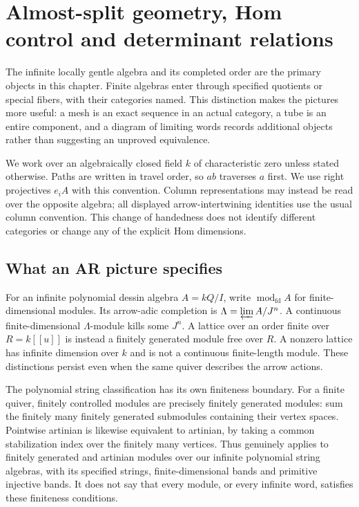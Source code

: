 \chapter[AR geometry and determinant relations]{Almost-split geometry, Hom control and determinant relations}
\label{arb:chapter}

The infinite locally gentle algebra and its completed order are the primary
objects in this chapter. Finite algebras enter through specified quotients or
special fibers, with their categories named. This distinction makes the pictures
more useful: a mesh is an exact sequence in an actual category, a tube is an
entire component, and a diagram of limiting words records additional objects
rather than suggesting an unproved equivalence.

We work over an algebraically closed field $k$ of characteristic zero unless
stated otherwise. Paths are written in travel order, so $ab$ traverses $a$ first.
We use right projectives $e_iA$ with this convention. Column representations may
instead be read over the opposite algebra; all displayed arrow-intertwining
identities use the usual column convention. This change of handedness does not
identify different categories or change any of the explicit Hom dimensions.

\section{What an AR picture specifies}
For an infinite polynomial dessin algebra $A=kQ/I$, write
$\operatorname{mod}_{\mathrm{fd}}A$ for finite-dimensional modules. Its arrow-adic
completion is $\Lambda=\varprojlim A/J^n$. A continuous finite-dimensional
$\Lambda$-module kills some $J^n$. A lattice over an order finite over
$R=k[[u]]$ is instead a finitely generated module free over $R$. A nonzero
lattice has infinite dimension over $k$ and is not a continuous finite-length
module. These distinctions persist even when the same quiver describes the
arrow actions.

The polynomial string classification has its own finiteness boundary.
For a finite quiver, finitely controlled modules are precisely finitely generated
modules: sum the finitely many finitely generated submodules containing their
vertex spaces. Pointwise artinian is likewise equivalent to artinian, by taking
a common stabilization index over the finitely many vertices. Thus
\cite[Theorems 1.2--1.4]{ARBCrawleyBoevey} genuinely applies to finitely generated
and artinian modules over our infinite polynomial string algebras, with its
specified strings, finite-dimensional bands and primitive injective bands.
It does not say that every module, or every infinite word, satisfies these
finiteness conditions.

